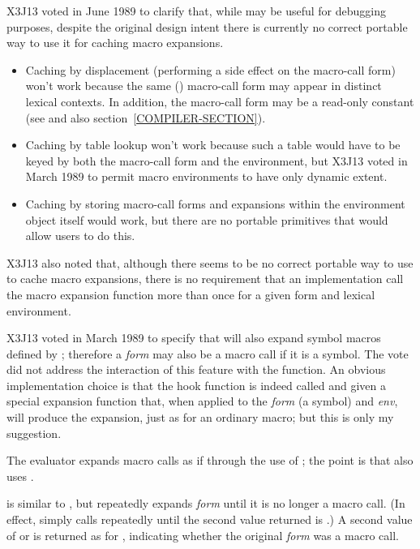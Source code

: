 \begin{defun}[Function]
\begin{newer}
X3J13 voted in June 1989  to clarify that, while
 may be useful for debugging purposes, despite
the original design intent there is
currently no correct portable way to use it for caching macro expansions.
\begin{itemize}
\item
 Caching by displacement (performing a side effect on the
 macro-call form) won't work because the same () macro-call
 form may appear in distinct lexical contexts.  In addition, the macro-call
 form may be a read-only constant (see  and also
 section~\ref{COMPILER-SECTION}).
\item
 Caching by table lookup won't work because such a table would have to
 be keyed by both the macro-call form and the environment,
 but X3J13 voted in March 1989 
 to permit macro environments to have only dynamic extent.
\item
 Caching by storing macro-call forms and expansions within the
 environment object itself would work, but there are no portable
 primitives that would allow users to do this.
\end{itemize}
X3J13 also noted that, although there seems to be no correct portable way to use
 to cache macro expansions, there is no
requirement that an implementation call the macro expansion
function more than once for a given form and lexical environment.
\end{newer}

\begin{new}
X3J13 voted in March 1989
to specify that  will also expand symbol macros
defined by ; therefore a \emph{form} may also be
a macro call if it is a symbol.  The vote did not address the interaction
of this feature with the  function.  An obvious
implementation choice is that the hook function is indeed called
and given a special expansion function that, when applied to the
\emph{form} (a symbol) and \emph{env}, will produce the expansion,
just as for an ordinary macro; but this is only my suggestion.
\end{new}

The evaluator expands macro calls as if through the use of ;
the point is that  also uses .

 is similar to ,
but repeatedly expands \emph{form} until it is no longer a macro call.
(In effect,  simply calls  repeatedly
until the second value returned is {\nil}.)
A second value of  or {\nil} is returned as for ,
indicating whether the original \emph{form} was a macro call.
\end{defun}

